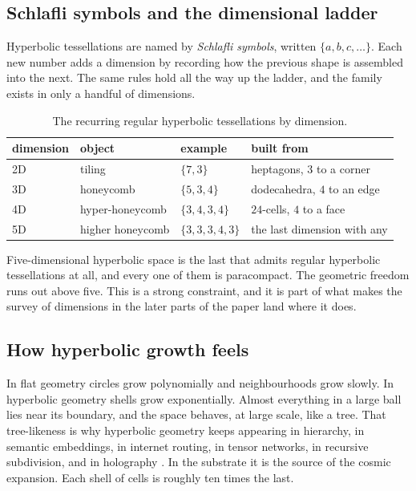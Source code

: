 \subsection{Schlafli symbols and the dimensional ladder}

Hyperbolic tessellations are named by \emph{Schlafli symbols}, written $\{a,b,c,\dots\}$. Each new number adds a dimension by recording how the previous shape is assembled into the next. The same rules hold all the way up the ladder, and the family exists in only a handful of dimensions.

\begin{table}[ht]
\centering
\begin{tabular}{@{}llll@{}}
\toprule
dimension & object & example & built from \\
\midrule
2D & tiling & $\{7,3\}$ & heptagons, $3$ to a corner \\
3D & honeycomb & $\{5,3,4\}$ & dodecahedra, $4$ to an edge \\
4D & hyper-honeycomb & $\{3,4,3,4\}$ & $24$-cells, $4$ to a face \\
5D & higher honeycomb & $\{3,3,3,4,3\}$ & the last dimension with any \\
\bottomrule
\end{tabular}
\caption{The recurring regular hyperbolic tessellations by dimension.}
\end{table}

Five-dimensional hyperbolic space is the last that admits regular hyperbolic tessellations at all, and every one of them is paracompact. The geometric freedom runs out above five. This is a strong constraint, and it is part of what makes the survey of dimensions in the later parts of the paper land where it does.

\subsection{How hyperbolic growth feels}

In flat geometry circles grow polynomially and neighbourhoods grow slowly. In hyperbolic geometry shells grow exponentially. Almost everything in a large ball lies near its boundary, and the space behaves, at large scale, like a tree. That tree-likeness is why hyperbolic geometry keeps appearing in hierarchy, in semantic embeddings, in internet routing, in tensor networks, in recursive subdivision, and in holography \cite{gromov1987,hamann2011}. In the substrate it is the source of the cosmic expansion. Each shell of cells is roughly ten times the last.

